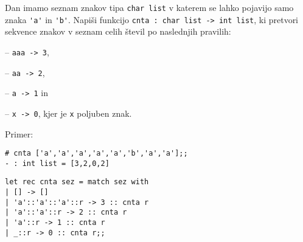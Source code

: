 \begin{ex}
  Dan imamo seznam znakov tipa \lstinline{char list} v katerem se lahko
  pojavijo samo znaka \lstinline{'a'} in \lstinline{'b'}. Napi\v si funkcijo
  \lstinline{cnta : char list -> int list}, ki pretvori sekvence znakov v
  seznam celih \v stevil po naslednjih pravilih:

    -- \lstinline{aaa -> 3},
    
    -- \lstinline{aa -> 2},
    
    -- \lstinline{a -> 1} in
    
    -- \lstinline{x -> 0}, kjer je \lstinline{x} poljuben znak.

\noindent\/Primer:
\begin{lstlisting}
# cnta ['a','a','a','a','a','b','a','a'];;
- : int list = [3,2,0,2]
\end{lstlisting}

\begin{sol}
\begin{lstlisting}
let rec cnta sez = match sez with
| [] -> []
| 'a'::'a'::'a'::r -> 3 :: cnta r 
| 'a'::'a'::r -> 2 :: cnta r 
| 'a'::r -> 1 :: cnta r 
| _::r -> 0 :: cnta r;;
\end{lstlisting}
\end{sol}
\end{ex} 



